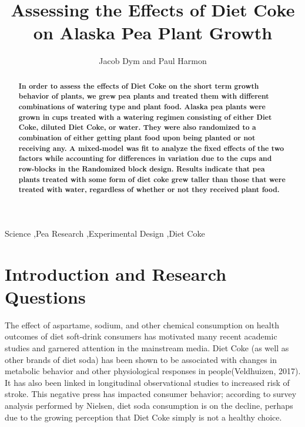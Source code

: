 \documentclass[1p,12pt]{elsarticle}\usepackage[]{graphicx}\usepackage[]{color}
\begin{document}
\begin{frontmatter}


\title{Assessing the Effects of Diet Coke on Alaska Pea Plant Growth}

\author{Jacob Dym and Paul Harmon}

\address{Montana State University}

\begin{abstract}
\textbf{
In order to assess the effects of Diet Coke on the short term growth behavior of plants, we grew pea plants and treated them with different combinations of watering type and plant food. Alaska pea plants were grown in cups treated with a watering regimen consisting of either Diet Coke, diluted Diet Coke, or water. They were also randomized to a combination of either getting plant food upon being planted or not receiving any. A mixed-model was fit to analyze the fixed effects of the two factors while accounting for differences in variation due to the cups and row-blocks in the Randomized block design. Results indicate that pea plants treated with some form of diet coke grew taller than those that were treated with water, regardless of whether or not they received plant food.
}
\end{abstract}
\begin{keyword}
Science \sep Pea Research \sep Experimental Design \sep Diet Coke
\end{keyword}


\end{frontmatter}



\section{Introduction and Research Questions}

The effect of aspartame, sodium, and other chemical consumption on health outcomes of diet soft-drink consumers has motivated many recent academic studies and garnered attention in the mainstream media. Diet Coke (as well as other brands of diet soda) has been shown to be associated with changes in metabolic behavior and other physiological responses  in people(Veldhuizen, 2017). It has also been linked in longitudinal observational studies to increased risk of stroke. This negative press has impacted consumer behavior; according to survey analysis performed by Nielsen, diet soda consumption is on the decline, perhaps due to the growing perception that Diet Coke simply is not a healthy choice.
\end{document}
